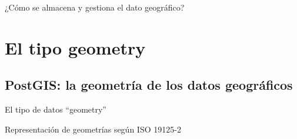 \documentclass{classes/beamer_GeomaticaUA}
\begin{document}
\begin{frame}{¿Cómo se almacena y gestiona el dato geográfico?}
\begin{center}
\resizebox{1.15\textheight}{!}{}
\end{center}
\end{frame}

\section[Geometría]{El tipo geometry}
\subsection{PostGIS: la geometría de los datos geográficos}

\begin{frame}{El tipo de datos ``geometry''}
\begin{block}{Representación de geometrías según ISO 19125-2}
\end{block}
\end{frame}
\end{document}
